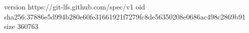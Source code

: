 version https://git-lfs.github.com/spec/v1
oid sha256:37886e5d994b280e60fe31661921f7279fc8de56350208e0686ac498c2869b91
size 360763
